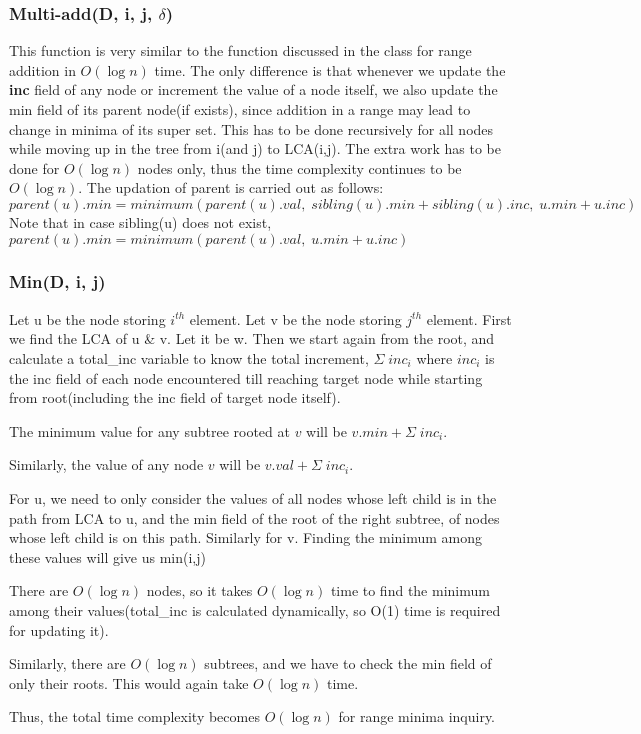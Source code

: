 \documentclass{article}
\begin{document}
\subsubsection{Multi-add(D, i, j, $\delta$)}
This function is very similar to the function discussed in the class for range addition in $O(\log n)$ time. The only difference is that whenever we update the \textbf{inc} field of any node or increment the value of a node itself, we also update the  min field of its parent node(if exists), since addition in a range may lead to change in minima of its super set. This has to be done recursively for all nodes while moving up in the tree from i(and j) to LCA(i,j). The extra work has to be done for $O(\log n)$ nodes only, thus the time complexity continues to be $O(\log n)$.
The updation of parent is carried out as follows:
$$parent(u).min = minimum(parent(u).val, \; sibling(u).min + sibling(u).inc, \; u.min + u.inc)$$
Note that in case sibling(u) does not exist, $parent(u).min = minimum(parent(u).val, \; u.min + u.inc)$
\par
\subsubsection{Min(D, i, j)}
Let u be the node storing $i^{th}$ element.
Let v be the node storing $j^{th}$ element.
First we find the LCA of u \& v. Let it be w. Then we start again from the root, and calculate a total\_inc variable to know the total increment, $\Sigma \; inc_i$ where $inc_i$ is the inc field of each node encountered till reaching target node while starting from root(including the inc field of target node itself). 
\par
The minimum value for any subtree rooted at $v$ will be $v.min + \Sigma \; inc_i$.
\par
Similarly, the value of any node $v$ will be $v.val + \Sigma \; inc_i$.
\par
 For u, we need to only consider the values of all nodes whose left child is in the path from LCA to u, and the min field of the root of the right subtree, of nodes whose left child is on this path. Similarly for v. Finding the minimum among these values will give us min(i,j)
\par
There are $O(\log n)$ nodes, so it takes $O(\log n)$ time to find the minimum among their values(total\_inc is calculated dynamically, so O(1) time is required for updating it).
\par
Similarly, there are $O(\log n)$ subtrees, and we have to check the min field of only their roots. This would again take $O(\log n)$ time.
\par
Thus, the total time complexity becomes $O(\log n)$ for range minima inquiry.
\end{document}
